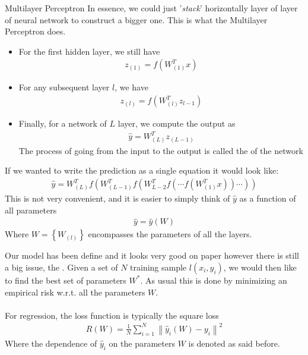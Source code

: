 \begin{parag}{Multilayer Perceptron}
	In essence, we could just '\textit{stack}' horizontally layer of layer of neural network to construct a bigger one. This is what the Multilayer Perceptron does. 
	\begin{itemize}
		\item For the first hidden layer, we still have 
			\begin{align*} 
				z_{\left(1\right)} =  f\left(W_{\left(1\right)}^{T}x\right)
			\end{align*}
			\item For any subsequent layer $l$, we have 
				\begin{align*} 
					z_{\left(l\right)} = f\left(W_{\left(l\right)}^{T}z_{l - 1}\right)
				\end{align*}
				\item Finally, for a network of $L$ layer, we compute the output as 
					\begin{align*} 
						\hat{y} = W_{\left(L\right)}^{T}z_{\left(L - 1\right)}
					\end{align*}
				The process of going from the input to the output is called the  of the network
	\end{itemize}
	If we wanted to write the prediction as a single equation it would look like:
	\begin{align*} 
		\hat{y} =  W_{\left(L\right)}^{T}f\left(W_{\left(L - 1\right)}^{T}f\left(W_{L - 2}^{T}f\left(\cdots f\left(W_{\left(1\right)}^{T}x\right)\right)\cdots\right)\right)
	\end{align*}
    This is not very convenient, and it is easier to simply think of $\hat{y}$ as a function of all parameters
	\begin{align*} 
		\hat{y} = \hat{y}\left(W\right)
	\end{align*}
	Where $W =  \left\{W_{\left(l\right)}\right\}$ encompasses the parameters of all the layers.
\end{parag}

Our model has been define and it looks very good on paper however there is still a big issue, the . Given a set of $N$ training sample $l\left(x_i, y_i\right)$, we would then like to find the best set of parameters $W^{\ast}$. As usual this is done by minimizing an empirical risk w.r.t. all the parameters $W$.\\
$ $ \\
For regression, the loss function is typically the square loss 
\begin{align*} 
	R\left(W\right) = \frac{1}{N} \sum_{i= 1}^{N}\left\|\hat{y}_i\left(W\right) - y_i\right\|^2
\end{align*}
Where the dependence of $\hat{y}_i $ on the parameters $W$ is denoted as said before.



